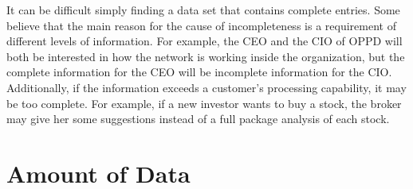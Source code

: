 It can be difficult simply finding a data set that contains complete entries. 
Some believe that the main reason for the cause of incompleteness is a requirement of different levels of information. 
For example, the CEO and the CIO of OPPD will both be interested in how the network is working inside the organization,
but the complete information for the CEO will be incomplete information for the CIO. 
Additionally, if the information exceeds a customer’s processing capability, it may be too complete. 
For example, if a new investor wants to buy a stock, the broker may give her some suggestions instead 
of a full package analysis of each stock.

\section{Amount of Data}

\lipsum 
